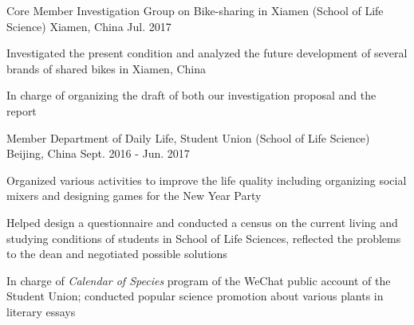 


\begin{cventries}




\cventry
{Core Member} %
{Investigation Group on Bike-sharing in Xiamen (School of Life Science)} %
{Xiamen, China} %
{Jul. 2017} %
{ %
\begin{cvitems}
\item {Investigated the present condition and analyzed the future development of several brands of shared bikes in Xiamen, China}
\item {In charge of organizing the draft of both our investigation proposal and the report}
\end{cvitems}
}


\cventry
{Member} %
{Department of Daily Life, Student Union (School of Life Science)} %
{Beijing, China} %
{Sept. 2016 - Jun. 2017} %
{ %
\begin{cvitems}
\item {Organized various activities to improve the life quality including organizing social mixers and designing games for the New Year Party}
\item {Helped design a questionnaire and conducted a census on the current living and studying conditions of students in School of Life Sciences, reflected the problems to the dean and negotiated possible solutions}
\item {In charge of \textit{Calendar of Species} program of the WeChat public account of the Student Union; conducted popular science promotion about various plants in literary essays}
\end{cvitems}
}


\end{cventries}